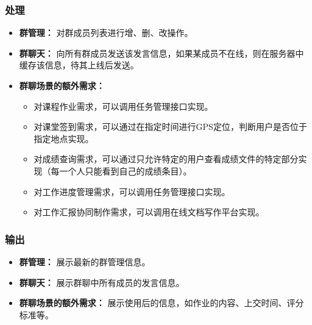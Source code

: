 \subsubsection{处理}
\begin{itemize}
  \item \textbf{群管理：} 对群成员列表进行增、删、改操作。
  \item \textbf{群聊天：} 向所有群成员发送该发言信息，如果某成员不在线，则在服务器中缓存该信息，待其上线后发送。
  \item \textbf{群聊场景的额外需求：}
  \begin{itemize}
    \item 对课程作业需求，可以调用任务管理接口实现。
    \item 对课堂签到需求，可以通过在指定时间进行GPS定位，判断用户是否位于指定地点实现。
    \item 对成绩查询需求，可以通过只允许特定的用户查看成绩文件的特定部分实现（每一个人只能看到自己的成绩条目）。
    \item 对工作进度管理需求，可以调用任务管理接口实现。
    \item 对工作汇报协同制作需求，可以调用在线文档写作平台实现。
  \end{itemize}
\end{itemize}
\subsubsection{输出}
\begin{itemize}
  \item \textbf{群管理：} 展示最新的群管理信息。
  \item \textbf{群聊天：} 展示群聊中所有成员的发言信息。
  \item \textbf{群聊场景的额外需求：} 展示使用后的信息，如作业的内容、上交时间、评分标准等。
\end{itemize}